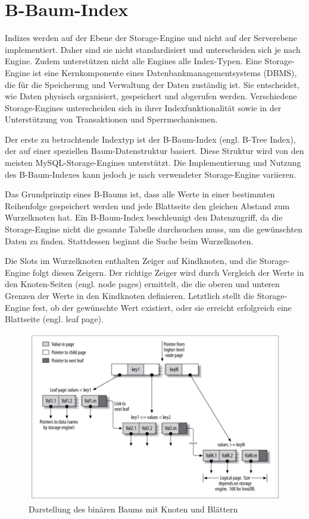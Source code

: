 \section{B-Baum-Index}

Indizes werden auf der Ebene der Storage-Engine und nicht auf der Serverebene implementiert.
Daher sind sie nicht standardisiert und unterscheiden sich je nach Engine.
Zudem unterstützen nicht alle Engines alle Index-Typen.
Eine Storage-Engine ist eine Kernkomponente eines Datenbankmanagementsystems (DBMS), die für die Speicherung und Verwaltung der Daten zuständig ist.
Sie entscheidet, wie Daten physisch organisiert, gespeichert und abgerufen werden.
Verschiedene Storage-Engines unterscheiden sich in ihrer Indexfunktionalität sowie in der Unterstützung von Transaktionen und Sperrmechanismen.

Der erste zu betrachtende Indextyp ist der B-Baum-Index (engl. B-Tree Index), der auf einer speziellen Baum-Datenstruktur basiert.
Diese Struktur wird von den meisten MySQL-Storage-Engines unterstützt.
Die Implementierung und Nutzung des B-Baum-Indexes kann jedoch je nach verwendeter Storage-Engine variieren.

Das Grundprinzip eines B-Baums ist, dass alle Werte in einer bestimmten Reihenfolge gespeichert werden und jede Blattseite den gleichen Abstand zum Wurzelknoten hat.
Ein B-Baum-Index beschleunigt den Datenzugriff, da die Storage-Engine nicht die gesamte Tabelle durchsuchen muss, um die gewünschten Daten zu finden.
Stattdessen beginnt die Suche beim Wurzelknoten.

Die Slots im Wurzelknoten enthalten Zeiger auf Kindknoten, und die Storage-Engine folgt diesen Zeigern.
Der richtige Zeiger wird durch Vergleich der Werte in den Knoten-Seiten (engl. node pages) ermittelt, die die oberen und unteren Grenzen der Werte in den Kindknoten definieren.
Letztlich stellt die Storage-Engine fest, ob der gewünschte Wert existiert, oder sie erreicht erfolgreich eine Blattseite (engl. leaf page).

\begin{figure}[!ht]
    \centering
    \includegraphics[width=.8\textwidth]{PNGs/Textbook/B_Tree_Visualisation}
    \caption[Binärbaum - Grafik]{Darstellung des binären Baums mit Knoten und Blättern}
    \label{fig:b-tree-visualisation}
\end{figure}

